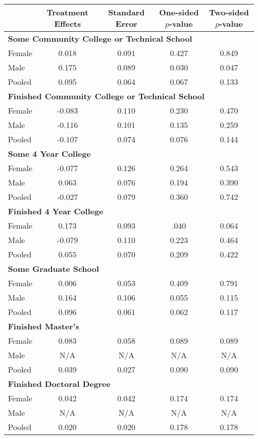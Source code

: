  \begin{tabular}{lcccc} \hline \hline
 & Treatment Effects  & Standard Error  & One-sided $p$-value  & Two-sided $p$-value  \\  \hline  
   \multicolumn{5}{l}{\textbf{Some Community College or Technical School}}\\
Female &     0.018 &     0.091 &     0.427 &     0.849 \\  
Male &     0.175 &     0.089 &     0.030 &     0.047 \\  
Pooled &     0.095 &     0.064 &     0.067 &     0.133 \\
   \multicolumn{5}{l}{\textbf{Finished Community College or Technical School}}\\
Female  &    -0.083 &     0.110 &     0.230 &     0.470 \\  
Male &    -0.116 &     0.101 &    0.135 &     0.259 \\  
Pooled &    -0.107 &     0.074 &     0.076 &     0.144 \\  
   \multicolumn{5}{l}{\textbf{Some 4 Year College}}\\
Female  &    -0.077 &     0.126 &     0.264 &     0.543 \\  
Male &     0.063 &     0.076 &     0.194 &     0.390 \\  
Pooled &    -0.027 &     0.079 &     0.360 &     0.742 \\
   \multicolumn{5}{l}{\textbf{Finished 4 Year College}}\\  
Female  &     0.173 &     0.093 &     .040 &     0.064 \\  
Male &    -0.079 &     0.110 &    0.223 &     0.464 \\  
Pooled &     0.055 &     0.070 &     0.209 &     0.422 \\ 
   \multicolumn{5}{l}{\textbf{Some Graduate School}}\\ 
Female  &     0.006 &     0.053 &     0.409 &     0.791 \\  
Male &     0.164 &     0.106 &     0.055 &     0.115 \\  
Pooled &     0.096 &     0.061 &     0.062 &     0.117 \\  
   \multicolumn{5}{l}{\textbf{Finished Master's}}\\
Female  &     0.083 &     0.058 &     0.089 &     0.089 \\  
Male &     N/A &     N/A &     N/A &     N/A \\  
Pooled &     0.039 &     0.027 &     0.090 &     0.090 \\  
   \multicolumn{5}{l}{\textbf{Finished Doctoral Degree}}\\
Female  &     0.042 &     0.042 &     0.174 &     0.174 \\  
Male &     N/A &     N/A &     N/A &     N/A \\  
Pooled &     0.020 &     0.020 &     0.178 &     0.178 \\  
\hline \hline \end{tabular}